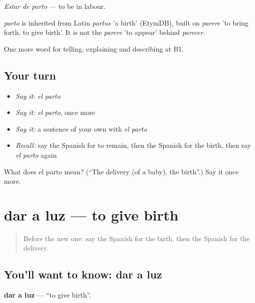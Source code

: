\emph{Estar de parto} — to be in labour.

\begin{cousinweb}
\emph{parto} is inherited from Latin \emph{partus} 'a birth' (EtymDB), built on \emph{parere} 'to bring forth, to give birth'. It is not the \emph{parere} 'to appear' behind \emph{parecer}.
\end{cousinweb}

\begin{grammarlens}[title={What you've built}]
One more word for telling, explaining and describing at B1.
\end{grammarlens}

\subsection*{Your turn}
\begin{itemize}
\raggedright
  \item \emph{Say it:} \emph{el parto}
  \item \emph{Say it:} \emph{el parto}, once more
  \item \emph{Say it:} a sentence of your own with \emph{el parto}
  \item \emph{Recall:} say the Spanish for to remain, then the Spanish for the birth, then say \emph{el parto} again
\end{itemize}

\begin{tcolorbox}[breakable,colback=teal!4,colframe=teal!35!black,title={Before you move on}]
What does el parto mean? (\textquotedblleft{}The delivery (of a baby), the birth\textquotedblright{}.) Say it once more.
\end{tcolorbox}
\section[dar a luz]{dar a luz — to give birth}

\label{lesson:ES-C544-dar-a-luz}



\begin{quote}
Before the new one: say the Spanish for the birth, then the Spanish for the delivery.
\end{quote}

\subsection*{You'll want to know: dar a luz}
\textbf{dar a luz} — \textquotedblleft{}to give birth\textquotedblright{}.

